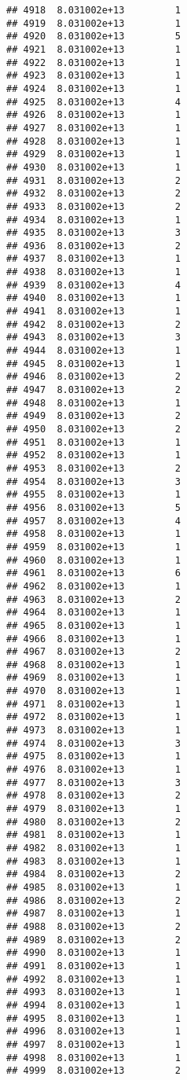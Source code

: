 \documentclass[
]{article}
\begin{document}
\begin{verbatim}
## 4918  8.031002e+13         1
## 4919  8.031002e+13         1
## 4920  8.031002e+13         5
## 4921  8.031002e+13         1
## 4922  8.031002e+13         1
## 4923  8.031002e+13         1
## 4924  8.031002e+13         1
## 4925  8.031002e+13         4
## 4926  8.031002e+13         1
## 4927  8.031002e+13         1
## 4928  8.031002e+13         1
## 4929  8.031002e+13         1
## 4930  8.031002e+13         1
## 4931  8.031002e+13         2
## 4932  8.031002e+13         2
## 4933  8.031002e+13         2
## 4934  8.031002e+13         1
## 4935  8.031002e+13         3
## 4936  8.031002e+13         2
## 4937  8.031002e+13         1
## 4938  8.031002e+13         1
## 4939  8.031002e+13         4
## 4940  8.031002e+13         1
## 4941  8.031002e+13         1
## 4942  8.031002e+13         2
## 4943  8.031002e+13         3
## 4944  8.031002e+13         1
## 4945  8.031002e+13         1
## 4946  8.031002e+13         2
## 4947  8.031002e+13         2
## 4948  8.031002e+13         1
## 4949  8.031002e+13         2
## 4950  8.031002e+13         2
## 4951  8.031002e+13         1
## 4952  8.031002e+13         1
## 4953  8.031002e+13         2
## 4954  8.031002e+13         3
## 4955  8.031002e+13         1
## 4956  8.031002e+13         5
## 4957  8.031002e+13         4
## 4958  8.031002e+13         1
## 4959  8.031002e+13         1
## 4960  8.031002e+13         1
## 4961  8.031002e+13         6
## 4962  8.031002e+13         1
## 4963  8.031002e+13         2
## 4964  8.031002e+13         1
## 4965  8.031002e+13         1
## 4966  8.031002e+13         1
## 4967  8.031002e+13         2
## 4968  8.031002e+13         1
## 4969  8.031002e+13         1
## 4970  8.031002e+13         1
## 4971  8.031002e+13         1
## 4972  8.031002e+13         1
## 4973  8.031002e+13         1
## 4974  8.031002e+13         3
## 4975  8.031002e+13         1
## 4976  8.031002e+13         1
## 4977  8.031002e+13         3
## 4978  8.031002e+13         2
## 4979  8.031002e+13         1
## 4980  8.031002e+13         2
## 4981  8.031002e+13         1
## 4982  8.031002e+13         1
## 4983  8.031002e+13         1
## 4984  8.031002e+13         2
## 4985  8.031002e+13         1
## 4986  8.031002e+13         2
## 4987  8.031002e+13         1
## 4988  8.031002e+13         2
## 4989  8.031002e+13         2
## 4990  8.031002e+13         1
## 4991  8.031002e+13         1
## 4992  8.031002e+13         1
## 4993  8.031002e+13         1
## 4994  8.031002e+13         1
## 4995  8.031002e+13         1
## 4996  8.031002e+13         1
## 4997  8.031002e+13         1
## 4998  8.031002e+13         1
## 4999  8.031002e+13         2

\end{verbatim}
\end{document}

